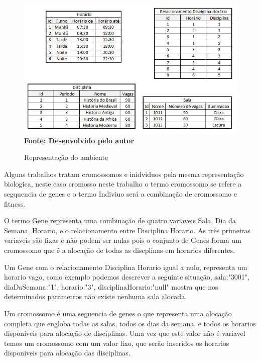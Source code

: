 \begin{figure}[!htb]
\caption[Representação do ambiente]{Representação do ambiente}
\label{fig:figura1}
\centering
\includegraphics{imagens/representacaoAmbiente.png}
\\ \textbf{\footnotesize Fonte: Desenvolvido pelo autor}
\end{figure}


	Alguns trabalhos tratam cromossomos e inidviduos pela mesma representação biologica, neste caso cromosso neste trabalho o termo cromossomo se refere a segquencia de genes e o termo Indiviuo será a combinação de cromossomo e fitness.\par

	O termo Gene representa uma combinação de quatro variaveis Sala, Dia da Semana, Horario, e o relacionamento entre Disciplina Horario. As três primeiras variaveis são fixas e não podem ser nulas pois o conjunto de Genes forma um cromossomo que é a alocação de todas as discplinas em horarios diferentes.\par

	Um Gene com o relacionamento Disciplina Horario igual a nulo, representa um horario vago, como exemplo podemos descrever a seguinte situação, {sala:"3001", diaDaSemana:"1", horario:"3", disciplinaHorario:"null"} mostra que nos determinados parametros não existe nenhuma sala alocada.\par

	Um cromossomo é uma seguencia de genes o que representa uma alocação completa que engloba todas as salas, todos os dias da semana, e todos os horarios disponiveis para alocação de disciplinas. Uma vez que este valor não é variavel temos um cromossomo com um valor fixo, que serão inseridos os horarios disponiveis para alocação das disciplinas.\par


